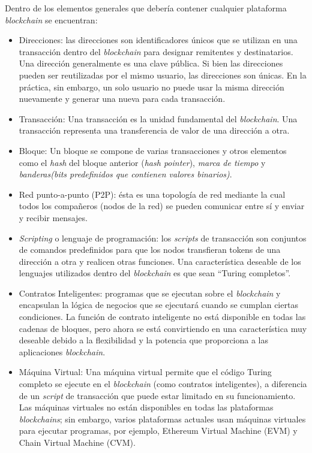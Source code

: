 Dentro de los elementos generales que debería contener cualquier plataforma \textit{blockchain} se encuentran:
\begin{itemize}
    \item Direcciones: las direcciones son identificadores únicos que se utilizan en una transacción dentro del \textit{blockchain} para designar remitentes y destinatarios. Una dirección generalmente es una clave pública. Si bien las direcciones pueden ser reutilizadas por el mismo usuario, las direcciones son únicas. En la práctica, sin embargo, un solo usuario no puede usar la misma dirección nuevamente y generar una nueva para cada transacción. 
    \item Transacción: Una transacción es la unidad fundamental del \textit{blockchain}. Una transacción representa una transferencia de valor de una dirección a otra.
    \item Bloque: Un bloque se compone de varias transacciones y otros elementos como el {\it hash} del bloque anterior ({\it hash pointer}), {\it marca de tiempo} y {\it banderas(bits predefinidos que contienen valores binarios)}.
    \item Red punto-a-punto (P2P): ésta es una topología de red mediante la cual todos los compañeros (nodos de la red) se pueden comunicar entre sí y enviar y recibir mensajes.
    \item {\it Scripting} o lenguaje de programación: los {\it scripts} de transacción son conjuntos de comandos predefinidos para que los nodos transfieran tokens de una dirección a otra y realicen otras funciones. Una característica deseable de los lenguajes utilizados dentro del \textit{blockchain} es que sean “Turing completos”.
    \item Contratos Inteligentes: programas que se ejecutan sobre el \textit{blockchain} y encapsulan la lógica de negocios que se ejecutará cuando se cumplan ciertas condiciones. La función de contrato inteligente no está disponible en todas las cadenas de bloques, pero ahora se está convirtiendo en una característica muy deseable debido a la flexibilidad y la potencia que proporciona a las aplicaciones \textit{blockchain}.
    \item Máquina Virtual: Una máquina virtual permite que el código Turing completo se ejecute en el \textit{blockchain} (como contratos inteligentes), a diferencia  de un {\it script} de transacción que puede estar limitado en su funcionamiento. Las máquinas virtuales no están disponibles en todas las plataformas  \textit{blockchains}; sin embargo, varios plataformas actuales usan máquinas virtuales para ejecutar programas, por ejemplo, Ethereum Virtual Machine (EVM) y Chain Virtual Machine (CVM).

\end{itemize}
